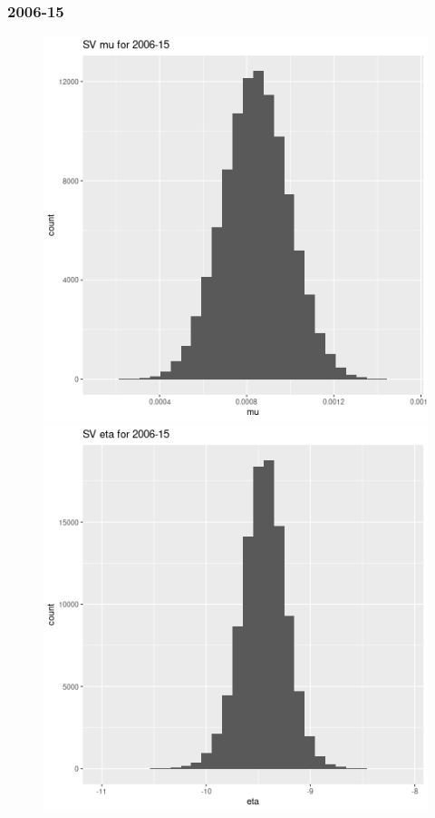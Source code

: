\documentclass[12pt,letterpaper,reqno,fleqn]{article}
\begin{document}
\subsubsection{2006-15}
\begin{figure}
\includegraphics[scale = .4]{svmu0615}
\includegraphics[scale = .4]{sve0615}

\end{figure}
\end{document}
